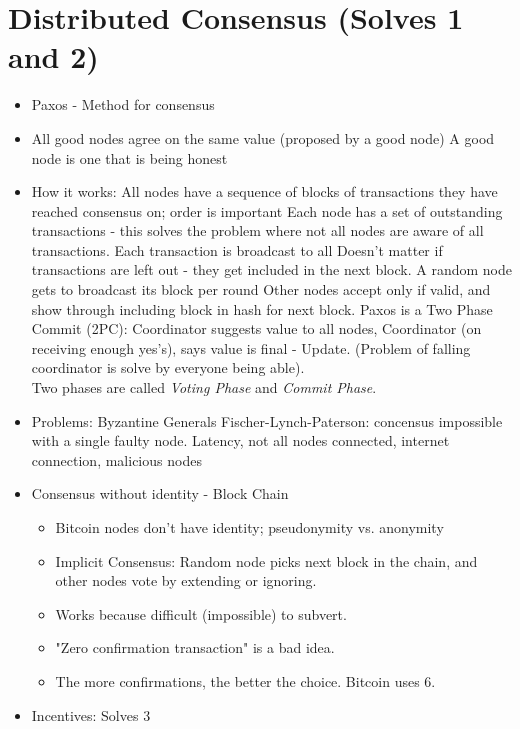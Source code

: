 \documentclass{article}
\begin{document}
\section*{Distributed Consensus (Solves 1 and 2)}
\begin{itemize}
  \item Paxos - Method for consensus
  \item All good nodes agree on the same value (proposed by a good node)
    \subitem A good node is one that is being honest
  \item How it works:
    \subitem All nodes have a sequence of blocks of transactions they have reached consensus on; order is important
    \subitem Each node has a set of outstanding transactions - this solves the problem where not all nodes are aware of all transactions.
    \subitem Each transaction is broadcast to all
    \subitem Doesn't matter if transactions are left out - they get included in the next block.
    \subitem A random node gets to broadcast its block per round
    \subitem Other nodes accept only if valid, and show through including block in hash for next block.
    \subitem Paxos is a Two Phase Commit (2PC): Coordinator suggests value to all nodes, Coordinator (on receiving enough
          yes's), says value is final - Update. (Problem of falling coordinator is solve by everyone being able).\\
          Two phases are called \emph{Voting Phase} and \emph{Commit Phase}.
  \item Problems: 
    \subitem Byzantine Generals
    \subitem Fischer-Lynch-Paterson: concensus impossible with a single faulty node.
    \subitem Latency, not all nodes connected, internet connection, malicious nodes
  \item Consensus without identity - Block Chain
    \begin{itemize}
      \item Bitcoin nodes don't have identity; pseudonymity vs. anonymity
      \item Implicit Consensus: Random node picks next block in the chain, and other nodes vote by extending or ignoring.
      \item Works because difficult (impossible) to subvert.
      \item "Zero confirmation transaction" is a bad idea.
      \item The more confirmations, the better the choice. Bitcoin uses 6.
    \end{itemize}
  \item Incentives: Solves 3

\end{itemize}
\end{document}
